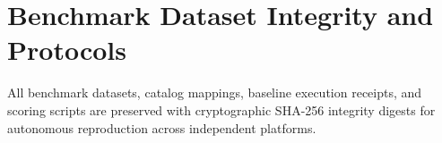 \documentclass[conference]{IEEEtran}
\begin{document}
\section{Benchmark Dataset Integrity and Protocols}\label{app:artifacts}
All benchmark datasets, catalog mappings, baseline execution receipts, and scoring scripts are preserved with cryptographic SHA-256 integrity digests for autonomous reproduction across independent platforms.
\end{document}
